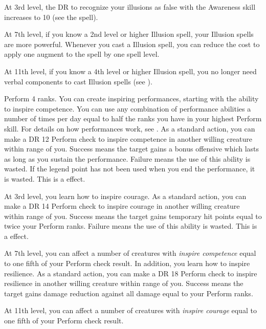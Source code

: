     At 3rd level, the DR to recognize your illusions as false with the Awareness skill increases to 10 (see the  spell).

    At 7th level, if you know a 2nd level or higher Illusion spell, your Illusion spells are more powerful.
    Whenever you cast a Illusion spell, you can reduce the cost to apply one augment to the spell by one spell level.

    At 11th level, if you know a 4th level or higher Illusion spell, you no longer need verbal components to cast Illusion spells (see ).

    \featpre Perform 4 ranks.
    \featben You can create inspiring performances, starting with the ability to inspire competence.
    You can use any combination of performance abilities a number of times per day equal to half the ranks you have in your highest Perform skill.
    For details on how performances work, see .
    As a standard action, you can make a DR 12 Perform check to inspire competence in another willing creature within \rngmed range of you.
    Success means the target gains a bonus offensive  which lasts as long as you sustain the performance.
    Failure means the use of this ability is wasted.
    If the legend point has not been used when you end the performance, it is wasted.
    This is a  effect.

    At 3rd level, you learn how to inspire courage.
     As a standard action, you can make a DR 14 Perform check to inspire courage in another willing creature within \rngmed range of you.
    Success means the target gains temporary hit points equal to twice your Perform ranks.
    Failure means the use of this ability is wasted.
    This is a  effect.

    At 7th level, you can affect a number of creatures with \textit{inspire competence} equal to one fifth of your Perform check result.
    In addition, you learn how to inspire resilience.
     As a standard action, you can make a DR 18 Perform check to inspire resilience in another willing creature within \rngmed range of you.
    Success means the target gains damage reduction against all damage equal to your Perform ranks.

    At 11th level, you can affect a number of creatures with \textit{inspire courage} equal to one fifth of your Perform check result.

